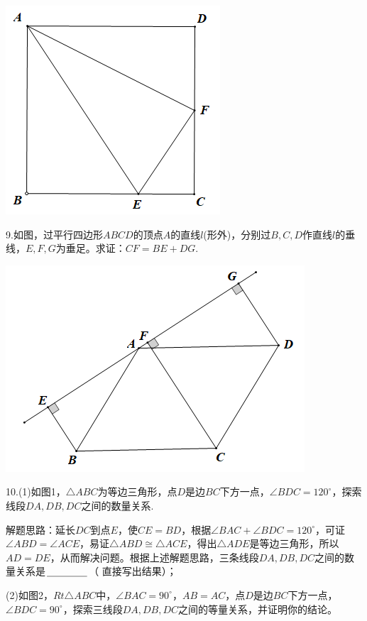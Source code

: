 \documentclass[10pt]{ctexart}
\begin{document}
\begin{flushright}
	\includegraphics[scale=0.6]{figure/jiechangbuduan12}
\end{flushright}

\begin{shaded}
	9.如图，过平行四边形$ABCD$的顶点$A$的直线$l$(形外)，分别过$B,C,D$作直线$l$的垂线，$E,F,G$为垂足。求证：$CF=BE+DG$.
\end{shaded}

\begin{flushright}
	\includegraphics[scale=0.6]{figure/jiechangbuduan13}
\end{flushright}

\begin{shaded}
10.(1)如图1，$\triangle ABC$为等边三角形，点$D$是边$BC$下方一点，$\angle BDC=120^\circ$，探索线段$DA,DB,DC$之间的数量关系.

解题思路：延长$DC$到点$E$，使$CE=BD$，根据$\angle BAC+\angle BDC=120^\circ$，可证$\angle
 ABD=\angle ACE$，易证$\triangle ABD\cong \triangle ACE$，得出$\triangle ADE$是等边三角形，所以$AD=DE$，从而解决问题。根据上述解题思路，三条线段$DA,DB,DC$之间的数量关系是$\underline{\hspace{1.5cm}}$（ 直接写出结果）；
 
(2)如图2，$Rt\triangle ABC$中，$\angle BAC=90^\circ$，$AB=AC$，点$D$是边$BC$下方一点，$\angle BDC=90^\circ$，探索三线段$DA,DB,DC$之间的等量关系，并证明你的结论。
\end{shaded}
\end{document}
